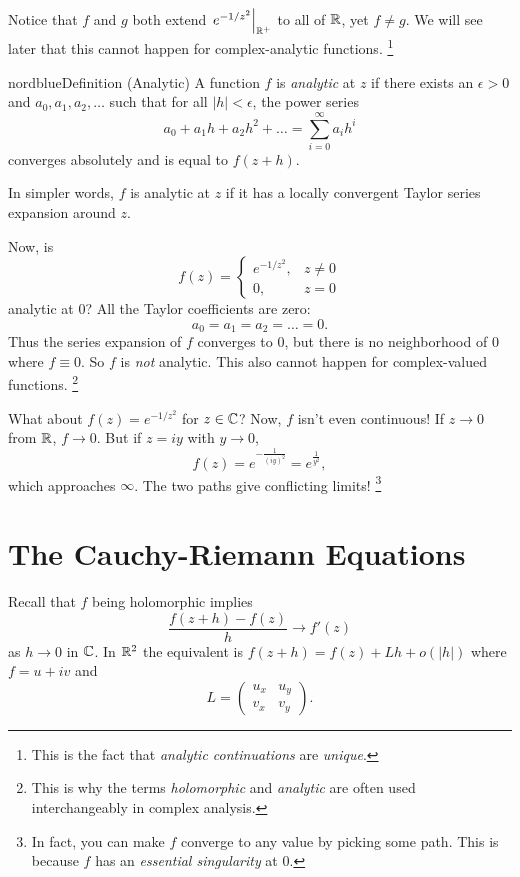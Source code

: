 Notice that $f$ and $g$ both extend
$\left.e^{-1 / z^2}\right\rvert_{\mathbb{R}^+}$ to all of $\mathbb{R}$,
yet $f \ne g$. We will see later that this cannot
happen for complex-analytic functions.
\footnote{This is the fact that \textit{analytic continuations} are \textit{unique}.}

\begin{mybox}{nordblue}{Definition (Analytic)}
  A function $f$ is \textit{analytic} at $z$ if there
  exists an $\epsilon > 0$ and $a_0, a_1, a_2, \dots$
  such that for all $|h| < \epsilon$, the power series
  \[
  a_0 + a_1 h + a_2 h^2 + \dots
  = \sum_{i = 0}^{\infty} a_i h^i
  \] 
  converges absolutely and is equal to $f(z + h)$.
\end{mybox}

In simpler words, $f$ is analytic at $z$ if it has a
locally convergent Taylor series expansion around $z$.

Now, is
\[
f(z) =
\begin{cases}
  e^{-1 / z^2}, & z \neq 0 \\
  0, & z = 0
\end{cases}
\] 
analytic at $0$? All the Taylor coefficients
are zero:
\[
  a_0 = a_1 = a_2 = \dots = 0
.\]
Thus the series expansion of $f$ converges to $0$, but
there is no neighborhood of $0$ where $f \equiv 0$.
So $f$ is \textit{not} analytic. This also cannot
happen for complex-valued functions.
\footnote{This is why the terms \textit{holomorphic} and
\textit{analytic} are often used interchangeably in
  complex analysis.}

What about $f(z) = e^{-1 / z^2}$ for $z \in \mathbb{C}$?
Now, $f$ isn't even continuous! If $z \to 0$
from $\mathbb{R}$, $f \to 0$. But if $z = iy$ with $y \to 0$,
\[f(z) = e^{-\frac{1}{(iy)^2}} = e^{\frac{1}{y^2}},\]
which approaches $\infty$. The two paths give conflicting
limits!
\footnote{In fact, you can make $f$ converge to
  any value by picking some path. This is because $f$
  has an \textit{essential singularity} at $0$.}

\section{The Cauchy-Riemann Equations}
Recall that $f$ being holomorphic implies
\[
  \frac{f(z + h) - f(z)}{h} \to f'(z)
\] 
as $h \to 0$ in $\mathbb{C}$. In $\mathbb{R}^2$ the equivalent is
$f(z + h) = f(z) + Lh + o(|h|)$ where $f = u + iv$ and
\[
L =
\left(\begin{matrix}
  u_x & u_y \\
  v_x & v_y
\end{matrix}\right)
.\] 

